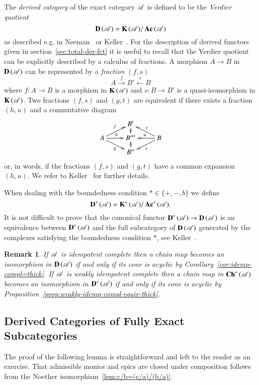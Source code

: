 \documentclass[1p]{elsarticle}
\theoremstyle{mythm}
\theoremstyle{mydef}
\newtheorem{Rem}[Thm]{Remark}
\begin{document}
The \emph{derived category} of the exact category $\operatorname{\mathscr{A}}$ 
is defined to be the \emph{Verdier quotient}
\[
\operatorname{\mathbf{D}}{(\operatorname{\mathscr{A}})} = \operatorname{\mathbf{K}}{(\operatorname{\mathscr{A}})}/ \operatorname{\mathbf{Ac}}{(\operatorname{\mathscr{A}})}
\]
as described e.g. in Neeman~\cite[Chapter~2]{MR1812507} or 
Keller~\cite[\S\S{} 10, 11]{MR1421815}. For the description of derived
functors given in section~\ref{sec:total-der-fct} it is
useful to recall that the
Verdier quotient can be explicitly described by a calculus of
fractions. A morphism $A \to B$ in $\operatorname{\mathbf{D}}{(\operatorname{\mathscr{A}})}$ can be represented by a
\emph{fraction} $(f,s)$
\[
A \xrightarrow{f} B' \xleftarrow{s} B
\]
where $f: A \to B$ is a morphism in $\operatorname{\mathbf{K}}{(\operatorname{\mathscr{A}})}$ and $s: B \to B'$ is
a quasi-isomorphism in $\operatorname{\mathbf{K}}{(\operatorname{\mathscr{A}})}$. Two fractions $(f,s)$ and
$(g,t)$ are equivalent if there exists a fraction $(h,u)$ and a
commutative diagram
\[
\xymatrix@R=0.6pc{
  & B' \ar[d] \\
  A \ar[ur]^{f} \ar[r]^{h} \ar[dr]_{g} & B''' & 
  B \ar[ul]_{s} \ar[l]_{u} \ar[dl]^{t} \\
  & B'' \ar[u]
}
\]
or, in words, if the fractions $(f,s)$ and $(g,t)$ have a common expansion
$(h,u)$. We refer to Keller~\cite[\S\S{} 9, 10]{MR1421815} for further details.

When dealing with the boundedness condition $\ast \in \{+,-,b\}$ we
define
\[
\operatorname{\mathbf{D}}^{\ast}{(\operatorname{\mathscr{A}})} = \operatorname{\mathbf{K}}^{\ast}{(\operatorname{\mathscr{A}})} / \operatorname{\mathbf{Ac}}^{\ast}{(\operatorname{\mathscr{A}})}.
\]
It is not difficult to prove that
the canonical functor $\operatorname{\mathbf{D}}^{\ast}{(\operatorname{\mathscr{A}})} \to \operatorname{\mathbf{D}}{(\operatorname{\mathscr{A}})}$ is an
equivalence between $\operatorname{\mathbf{D}}^{\ast}{(\operatorname{\mathscr{A}})}$ and the full subcategory of
$\operatorname{\mathbf{D}}{(\operatorname{\mathscr{A}})}$ generated by the complexes satisfying the boundedness
condition $\ast$, see Keller~\cite[11.7]{MR1421815}.

\begin{Rem}
  If $\operatorname{\mathscr{A}}$ is idempotent complete then a chain map becomes an isomorphism
  in $\operatorname{\mathbf{D}}{(\operatorname{\mathscr{A}})}$ if and only if its cone is acyclic by
  Corollary~\ref{cor:idemp-compl=thick}. If $\operatorname{\mathscr{A}}$ is
  weakly idempotent complete then a chain map in $\operatorname{\mathbf{Ch}}^{\ast}{(\operatorname{\mathscr{A}})}$
  becomes an isomorphism in $\operatorname{\mathbf{D}}^{\ast}{(\operatorname{\mathscr{A}})}$ if and only if its
  cone is acyclic by Proposition~\ref{prop:weakly-idemp-compl-equiv-thick}.
\end{Rem}

\subsection{Derived Categories of Fully Exact Subcategories}
\label{sec:der-cats-fully-exact-subcats}
The proof of the following lemma is straightforward and left to the
reader as an exercise. That admissible
monics and epics are closed under composition follows from the
Noether isomorphism~\ref{lem:c/b=(c/a)/(b/a)}.
\end{document}
